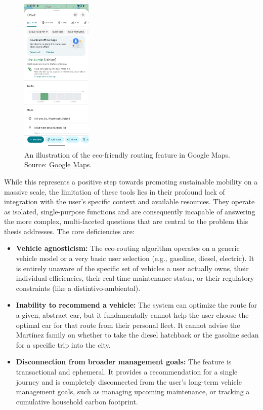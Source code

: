 \begin{figure}[H]
    \centering
    \includegraphics[width=0.3\textwidth]{images/background/google-maps-ecorouting.png}
    \caption{An illustration of the eco-friendly routing feature in Google Maps. Source: \href{https://maps.google.com}{Google Maps}.}
    \label{fig:google-maps-ecorouting}
\end{figure}

\textgap

While this represents a positive step towards promoting sustainable mobility on a massive scale, the limitation of these tools lies in their profound lack of integration with the user's specific context and available resources. They operate as isolated, single-purpose functions and are consequently incapable of answering the more complex, multi-faceted questions that are central to the problem this thesis addresses. The core deficiencies are:

\begin{itemize}
    \item \textbf{Vehicle agnosticism:} The eco-routing algorithm operates on a generic vehicle model or a very basic user selection (e.g., gasoline, diesel, electric). It is entirely unaware of the specific set of vehicles a user actually owns, their individual efficiencies, their real-time maintenance status, or their regulatory constraints (like a \gls{distintivo-ambiental}).
    
    \textgap
    
    \item \textbf{Inability to recommend a vehicle:} The system can optimize the route for a given, abstract car, but it fundamentally cannot help the user choose the optimal car for that route from their personal fleet. It cannot advise the Martínez family on whether to take the diesel hatchback or the gasoline sedan for a specific trip into the city.
    
    \textgap
    
    \item \textbf{Disconnection from broader management goals:} The feature is transactional and ephemeral. It provides a recommendation for a single journey and is completely disconnected from the user's long-term vehicle management goals, such as managing upcoming maintenance, or tracking a cumulative household carbon footprint.
\end{itemize}

